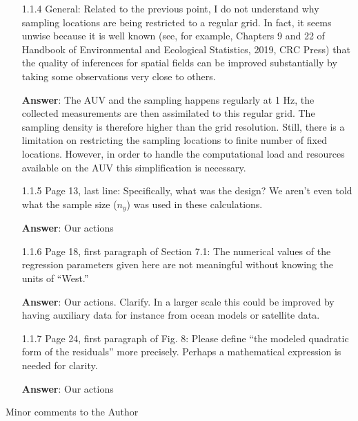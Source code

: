 \documentclass[a4paper]{article}
\def\action{\textbf{Answer}}
\begin{document}
\begin{answers}
\begin{itemize}[noitemsep,topsep=0pt,parsep=0pt,partopsep=0pt]
\item[1.1.4]\label{ec4} General: Related to the previous point, I do not understand why sampling locations are being restricted to a regular grid. In fact, it seems unwise because it is well known (see, for example, Chapters 9 and 22 of Handbook of Environmental and Ecological Statistics, 2019, CRC Press)
that the quality of inferences for spatial fields can be improved substantially by taking some
observations very close to others.\par
\action: The AUV and the sampling happens regularly at 1 Hz, the collected measurements are then assimilated to this regular grid. The sampling density is therefore higher than the grid resolution. Still, there is a limitation on restricting the sampling locations to finite number of fixed locations. However, in order to handle the computational load and resources available on the AUV this simplification is necessary. %
\vspace{1em}

\item[1.1.5]\label{ec5} Page 13, last line: Specifically, what was the design? We aren’t even told what the sample size ($n_y$) was used in these calculations.\par
\action: Our actions
\vspace{1em}

\item[1.1.6]\label{ec1} Page 18, first paragraph of Section 7.1: The numerical values of the regression parameters given here are not meaningful without knowing the units of “West.”\par
\action: Our actions. Clarify. In a larger scale this could be improved by having auxiliary data for instance from ocean models or satellite data.

\vspace{1em}

\item[1.1.7]\label{ec7} Page 24, first paragraph of Fig. 8: Please define “the modeled quadratic form of the residuals” more precisely. Perhaps a mathematical expression is needed for clarity.\par
\action: Our actions
\vspace{1em}

\end{itemize}


\item{Minor comments to the Author}\label{emc}


\end{answers}
\end{document}
